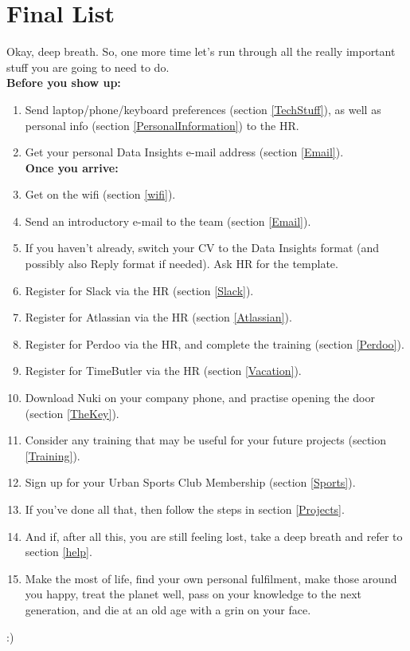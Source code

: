 \documentclass[11pt]{report}
\begin{document}
\chapter{Final List}
Okay, deep breath. So, one more time let's run through all the really important stuff you are going to need to do.\\

\noindent \textbf{Before you show up:}
\begin{enumerate}
\item Send laptop/phone/keyboard preferences (section \ref{TechStuff}), as well as personal info (section \ref{PersonalInformation}) to the HR.
\item Get your personal Data Insights e-mail address (section \ref{Email}).\\

\hspace{-0.95cm}\textbf{Once you arrive:}
\item Get on the wifi (section \ref{wifi}).
\item Send an introductory e-mail to the team (section \ref{Email}).
\item If you haven't already, switch your CV to the Data Insights format (and possibly also Reply format if needed). Ask HR for the template.
\item Register for Slack via the HR (section \ref{Slack}).
\item Register for Atlassian via the HR (section \ref{Atlassian}).
\item Register for Perdoo via the HR, and complete the training (section \ref{Perdoo}).
\item Register for TimeButler via the HR (section \ref{Vacation}).
\item Download Nuki on your company phone, and practise opening the door (section \ref{TheKey}).
\item Consider any training that may be useful for your future projects (section \ref{Training}).
\item Sign up for your Urban Sports Club Membership (section \ref{Sports}).
\item If you've done all that, then follow the steps in section \ref{Projects}.
\item And if, after all this, you are still feeling lost, take a deep breath and refer to section \ref{help}.
\item Make the most of life, find your own personal fulfilment, make those around you happy, treat the planet well, pass on your knowledge to the next generation, and die at an old age with a grin on your face.
\end{enumerate}
\vspace{1cm}
\begin{center}
:)
\end{center}
\end{document}
